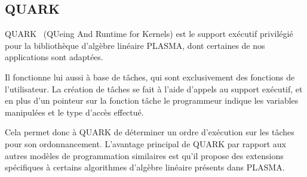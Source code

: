 \subsection{QUARK}

QUARK~\cite{Kurzak2013} (QUeing And Runtime for Kernels) est le support exécutif privilégié pour la bibliothèque d'algèbre linéaire PLASMA, dont certaines de nos applications sont adaptées.

Il fonctionne lui aussi à base de tâches, qui sont exclusivement des fonctions de l'utilisateur.
La création de tâches se fait à l'aide d'appels au support exécutif, et en plus d'un pointeur sur la fonction tâche le programmeur indique les variables manipulées et le type d'accès effectué.

Cela permet donc à QUARK de déterminer un ordre d'exécution sur les tâches pour son ordonnancement.
L'avantage principal de QUARK par rapport aux autres modèles de programmation similaires est qu'il propose des extensions spécifiques à certains algorithmes d'algèbre linéaire présents dans PLASMA.

